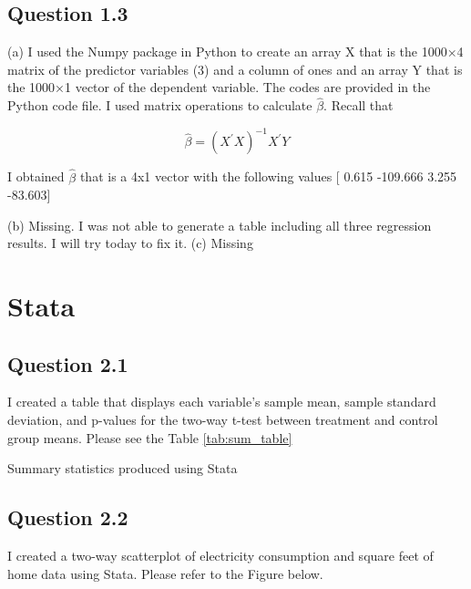 \documentclass{article}
\begin{document}
\FloatBarrier
\subsection*{Question 1.3}
(a) I used the Numpy package in Python to create an array X that is the 1000×4 matrix of the predictor variables (3) and a column of ones and an array Y that is the 1000×1 vector
of the dependent variable. The codes are provided in the Python code file. I used matrix operations to calculate \(\hat{\beta}\). Recall that 

\[\hat{\beta} = (X^{'}X)^{-1}X^{'}Y \]

I obtained \(\hat{\beta}\) that is a 4x1 vector with the following values [   0.615 -109.666  3.255 -83.603]

(b) Missing.  I was not able to generate a table including all three regression results. I will try today to fix it. 
(c) Missing

\FloatBarrier
\section*{Stata}

\subsection*{Question 2.1}

I created a table that displays each variable’s sample mean, sample standard deviation, and p-values for the two-way t-test between treatment and control group means. Please see the Table \ref{tab:sum_table}


\begin{table}[hbt!]
    \centering
    
    \caption{Summary statistics produced using Stata}
    \label{tab:sum_table}
\end{table}

\subsection*{Question 2.2}

I created a two-way scatterplot of electricity consumption and square feet of home data using Stata. Please refer to the Figure below.
\end{document}
